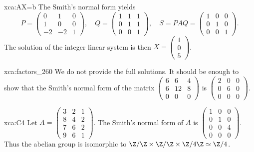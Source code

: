 \begin{sol}{xca:AX=b}
	The Smith's normal form yields 
	\[
		P=\begin{pmatrix}
			0 & 1 & 0\\
			1 & 0 & 0\\
			-2 & -2 & 1
		\end{pmatrix},
		\quad
		Q=\begin{pmatrix}
			1 & 1 & 1\\
			0 & 1 & 1\\
			0 & 0 & 1
		\end{pmatrix},\quad
		S=PAQ=\begin{pmatrix}
			1 & 0 & 0\\
			0 & 1 & 0\\
			0 & 0 & 1
		\end{pmatrix}.
	\]
	The solution of the integer linear system is then
	$X=\begin{pmatrix}
		1\\
		0\\
		5
	\end{pmatrix}$. 
\end{sol}

\begin{sol}{xca:factors_260}
	We do not provide the full solutions. It should be enough to
	show that the Smith's normal form
	of the matrix $\begin{pmatrix}
		6 & 6 & 4\\
		6 & 12 & 8\\
		0 & 0 & 0
	\end{pmatrix}$ is $\begin{pmatrix}
		2 & 0 & 0\\
		0 & 6 & 0\\
		0 & 0 & 0
	\end{pmatrix}$. 
\end{sol}

\begin{sol}{xca:C4}
    Let $A=\begin{pmatrix}
    3 & 2 & 1 \\
    8 & 4 & 2 \\
    7 & 6 & 2\\
    9 & 6 & 1
    \end{pmatrix}$.  
    The Smith's normal form of $A$  
    is $\begin{pmatrix}
        1 & 0 & 0 \\
        0 & 1 & 0 \\
        0 & 0 & 4 \\
        0 & 0 & 0
    \end{pmatrix}$. Thus the abelian group is isomorphic to $\Z/\Z\times\Z/\Z\times\Z/4\Z\simeq\Z/4$.  
\end{sol}

